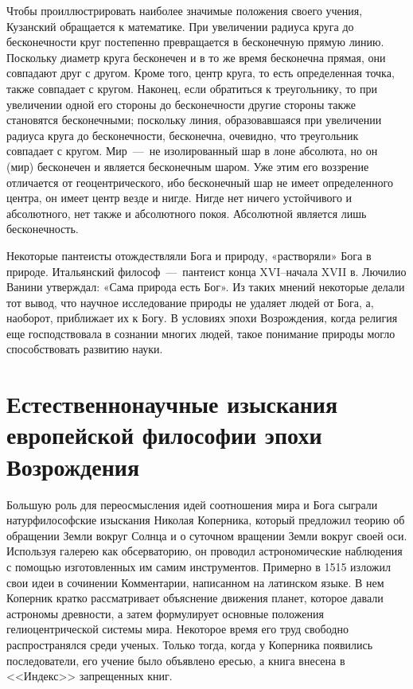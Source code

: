 \documentclass[14pt]{extarticle}
\begin{document}
Чтобы проиллюстрировать наиболее значимые положения своего учения, Кузанский обращается к математике. При увеличении радиуса круга до бесконечности круг постепенно превращается в бесконеч­ную прямую линию. Поскольку диаметр круга бесконечен и в то же время бесконечна прямая, они совпадают друг с другом. Кроме того, центр круга, то есть определенная точка, также совпадает с кругом. Наконец, если обратиться к треугольнику, то при увеличении одной его стороны до бесконечности другие стороны также становятся бесконечными; поскольку линия, образовавшаяся при увеличении радиуса круга до бесконечности, бесконечна, очевидно, что треугольник совпадает с кругом. Мир~---~не изолированный шар в лоне абсолюта, но он (мир) бесконечен и является беско­нечным шаром. Уже этим его воззрение отличается от геоцентрического, ибо бесконечный шар не имеет определенного центра, он имеет центр везде и нигде. Нигде нет ничего устойчивого и абсолютного, нет так­же и абсолютного покоя. Абсолютной является лишь бесконечность.

Некоторые пантеисты отождествляли Бога и природу, «растворяли» Бога в природе. Итальянский философ~---~пантеист конца XVI--начала XVII в. Лючилио Ванини утверждал: «Сама природа есть Бог». Из таких мнений некоторые делали тот вывод, что научное исследование природы не удаляет людей от Бога, а, наоборот, приближает их к Богу. В условиях эпохи Возрождения, когда религия еще господствовала в сознании многих людей, такое понимание природы могло способствовать развитию науки.

\section{Естественнонаучные изыскания европейской философии эпохи Возрождения}

Большую роль для переосмысления идей соотношения мира и Бога сыграли натурфилософские изыскания Николая Коперника, который предложил теорию об обращении Земли вокруг Солнца и о суточном вращении Земли вокруг своей оси. Используя галерею как обсерваторию, он проводил астрономические наблюдения с помощью изготовленных им самим инструментов. Примерно в 1515 изложил свои идеи в сочинении Комментарии, написанном на латинском языке. В нем Коперник кратко рассматривает объяснение движения планет, которое давали астрономы древности, а затем формулирует основные положения гелиоцентрической системы мира. Некоторое время его труд свободно распространялся среди ученых. Только тогда, когда у Коперника появились последователи, его учение было объявлено ересью, а книга внесена в <<Индекс>> запрещенных книг.
\end{document}
